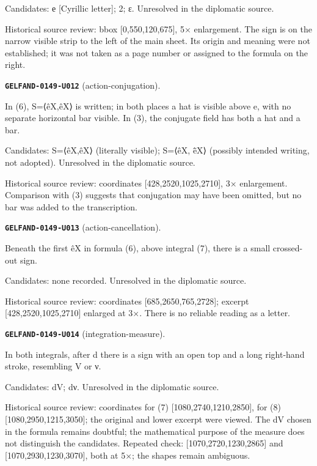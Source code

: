 \documentclass[11pt]{article}
\theoremstyle{definition}
\theoremstyle{remark}
\begin{document}
Candidates: е [Cyrillic letter]; 2; ε. Unresolved in the diplomatic source.\par
Historical source review: bbox [0,550,120,675], 5× enlargement. The sign is on the narrow visible strip to the left of the main sheet. Its origin and meaning were not established; it was not taken as a page number or assigned to the formula on the right.\par\medskip
\noindent\leavevmode{}\label{GELFAND-P001370:action-conjugation:note}\textbf{\texttt{GELFAND-0149-U012}} (action-conjugation).\par\nopagebreak[4]
In (6), S=⟨êX,êX⟩ is written; in both places a hat is visible above e, with no separate horizontal bar visible. In (3), the conjugate field has both a hat and a bar.\par
Candidates: S=⟨êX,êX⟩ (literally visible); S=⟨êX, ē̂X⟩ (possibly intended writing, not adopted). Unresolved in the diplomatic source.\par
Historical source review: coordinates [428,2520,1025,2710], 3× enlargement. Comparison with (3) suggests that conjugation may have been omitted, but no bar was added to the transcription.\par\medskip
\noindent\leavevmode{}\label{GELFAND-P001370:action-cancellation:note}\textbf{\texttt{GELFAND-0149-U013}} (action-cancellation).\par\nopagebreak[4]
Beneath the first êX in formula (6), above integral (7), there is a small crossed-out sign.\par
Candidates: none recorded. Unresolved in the diplomatic source.\par
Historical source review: coordinates [685,2650,765,2728]; excerpt [428,2520,1025,2710] enlarged at 3×. There is no reliable reading as a letter.\par\medskip
\noindent\leavevmode{}\label{GELFAND-P001370:integration-measure:note}\textbf{\texttt{GELFAND-0149-U014}} (integration-measure).\par\nopagebreak[4]
In both integrals, after d there is a sign with an open top and a long right-hand stroke, resembling V or ν.\par
Candidates: dV; dν. Unresolved in the diplomatic source.\par
Historical source review: coordinates for (7) [1080,2740,1210,2850], for (8) [1080,2950,1215,3050]; the original and lower excerpt were viewed. The dV chosen in the formula remains doubtful; the mathematical purpose of the measure does not distinguish the candidates. Repeated check: [1070,2720,1230,2865] and [1070,2930,1230,3070], both at 5×; the shapes remain ambiguous.\par\medskip
\end{document}
